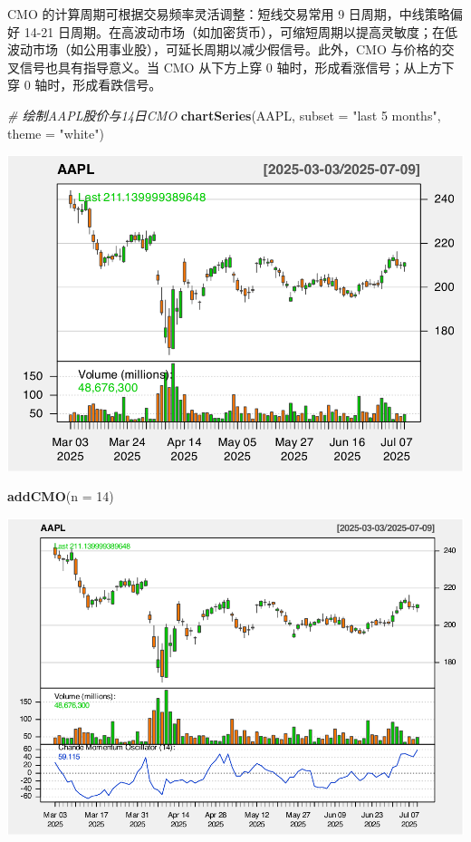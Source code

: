 \documentclass[]{ctexbook}
\newenvironment{Shaded}{\begin{snugshade}}{\end{snugshade}}
\newcommand{\AttributeTok}[1]{\textcolor[rgb]{0.13,0.29,0.53}{#1}}
\newcommand{\CommentTok}[1]{\textcolor[rgb]{0.56,0.35,0.01}{\textit{#1}}}
\newcommand{\DecValTok}[1]{\textcolor[rgb]{0.00,0.00,0.81}{#1}}
\newcommand{\FunctionTok}[1]{\textcolor[rgb]{0.13,0.29,0.53}{\textbf{#1}}}
\newcommand{\NormalTok}[1]{#1}
\newcommand{\StringTok}[1]{\textcolor[rgb]{0.31,0.60,0.02}{#1}}
\begin{document}
CMO 的计算周期可根据交易频率灵活调整：短线交易常用 9 日周期，中线策略偏好 14-21 日周期。在高波动市场（如加密货币），可缩短周期以提高灵敏度；在低波动市场（如公用事业股），可延长周期以减少假信号。此外，CMO 与价格的交叉信号也具有指导意义。当 CMO 从下方上穿 0 轴时，形成看涨信号；从上方下穿 0 轴时，形成看跌信号。

\begin{Shaded}
\begin{Highlighting}[]
\CommentTok{\# 绘制AAPL股价与14日CMO}
\FunctionTok{chartSeries}\NormalTok{(AAPL, }\AttributeTok{subset =} \StringTok{"last 5 months"}\NormalTok{, }\AttributeTok{theme =} \StringTok{"white"}\NormalTok{)}
\end{Highlighting}
\end{Shaded}

\includegraphics[width=0.9\linewidth]{quantmod_files/figure-latex/cmo-1}

\begin{Shaded}
\begin{Highlighting}[]
\FunctionTok{addCMO}\NormalTok{(}\AttributeTok{n =} \DecValTok{14}\NormalTok{)}
\end{Highlighting}
\end{Shaded}

\includegraphics[width=0.9\linewidth]{quantmod_files/figure-latex/cmo-2}
\end{document}
